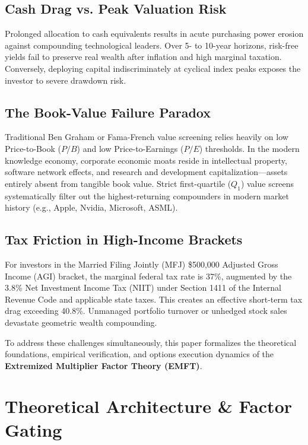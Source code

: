 \documentclass[11pt]{article}
\begin{document}
\subsection{Cash Drag vs. Peak Valuation Risk}
Prolonged allocation to cash equivalents results in acute purchasing power erosion against compounding technological leaders. Over 5- to 10-year horizons, risk-free yields fail to preserve real wealth after inflation and high marginal taxation. Conversely, deploying capital indiscriminately at cyclical index peaks exposes the investor to severe drawdown risk.

\subsection{The Book-Value Failure Paradox}
Traditional Ben Graham or Fama-French value screening relies heavily on low Price-to-Book ($P/B$) and low Price-to-Earnings ($P/E$) thresholds. In the modern knowledge economy, corporate economic moats reside in intellectual property, software network effects, and research and development capitalization---assets entirely absent from tangible book value. Strict first-quartile ($Q_1$) value screens systematically filter out the highest-returning compounders in modern market history (e.g., Apple, Nvidia, Microsoft, ASML).

\subsection{Tax Friction in High-Income Brackets}
For investors in the Married Filing Jointly (MFJ) \$500,000 Adjusted Gross Income (AGI) bracket, the marginal federal tax rate is 37\%, augmented by the 3.8\% Net Investment Income Tax (NIIT) under Section 1411 of the Internal Revenue Code and applicable state taxes. This creates an effective short-term tax drag exceeding 40.8\%. Unmanaged portfolio turnover or unhedged stock sales devastate geometric wealth compounding.

To address these challenges simultaneously, this paper formalizes the theoretical foundations, empirical verification, and options execution dynamics of the \textbf{Extremized Multiplier Factor Theory (EMFT)}.

\section{Theoretical Architecture \& Factor Gating}
\end{document}
